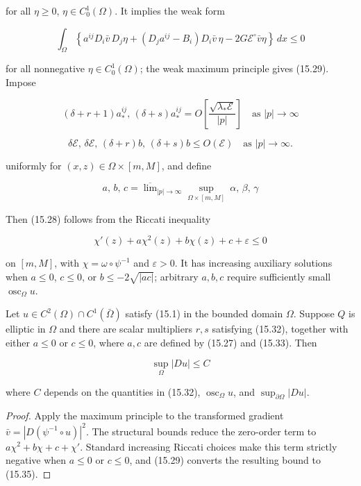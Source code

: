 for all \(\eta\ge0\), \(\eta\in C_0^1(\Omega)\). It implies the weak form

\begin{equation}\tag{15.31}
\int_{\Omega}\left\{a^{ij}D_i\bar v\,D_j\eta+(D_j a^{ij}-B_i)D_i\bar v\,\eta-2G\mathcal{E}^{\circ}\bar v\eta\right\}\,dx\le 0
\end{equation}



for all nonnegative \(\eta\in C_0^1(\Omega)\); the weak maximum principle gives
(15.29). Impose

\begin{equation}
\tag{15.32}
(\delta+r+1)a^{ij}_{*},\,(\delta+s)a^{ij}_{*}=O\!\left[\frac{\sqrt{\lambda_{*}\mathcal{E}}}{|p|}\right]
\quad\text{as }|p|\to\infty
\end{equation}

\[
\delta\mathcal{E},\,\delta\mathcal{E},\,(\delta+r)b,\,(\delta+s)b \le O(\mathcal{E}) \quad \text{as }|p|\to\infty.
\]

uniformly for \((x,z)\in\Omega\times[m,M]\), and define

\begin{equation}
\tag{15.33}
a,\,b,\,c = \overline{\lim}_{|p|\to\infty}\sup_{\Omega\times [m,M]}\ \alpha,\,\beta,\,\gamma
\end{equation}

Then (15.28) follows from the Riccati inequality

\begin{equation}
\tag{15.34}
\chi'(z)+a\chi^{2}(z)+b\chi(z)+c+\varepsilon\le 0
\end{equation}

on \([m,M]\), with \(\chi=\omega\circ\psi^{-1}\) and \(\varepsilon>0\).
It has increasing auxiliary solutions when \(a\le0\), \(c\le0\), or
\(b\le-2\sqrt{|ac|}\); arbitrary \(a,b,c\) require sufficiently small
\(\operatorname{osc}_\Omega u\).

\begin{theorem}\label{gt:thm-15-2}
Let $u\in C^2(\Omega)\cap C^1(\bar{\Omega})$ satisfy (15.1) in the bounded domain $\Omega$. Suppose $Q$ is elliptic in $\Omega$ and there are scalar multipliers $r,s$ satisfying (15.32), together with either $a\leq0$ or $c\leq0$, where $a,c$ are defined by (15.27) and (15.33). Then

\begin{equation}
\tag{15.35}
\sup_{\Omega} |Du| \leq C
\end{equation}

where $C$ depends on the quantities in (15.32), $\operatorname{osc}_{\Omega}u$, and $\sup_{\partial\Omega}|Du|$.
\end{theorem}
\begin{proof}
\sketch Apply the maximum principle to the transformed gradient
$\bar v=|D(\psi^{-1}\circ u)|^2$. The structural bounds reduce the zero-order term to
$a\chi^2+b\chi+c+\chi'$. Standard increasing Riccati choices make this term
strictly negative when $a\leq0$ or $c\leq0$, and (15.29) converts the resulting bound to (15.35).
\end{proof}

